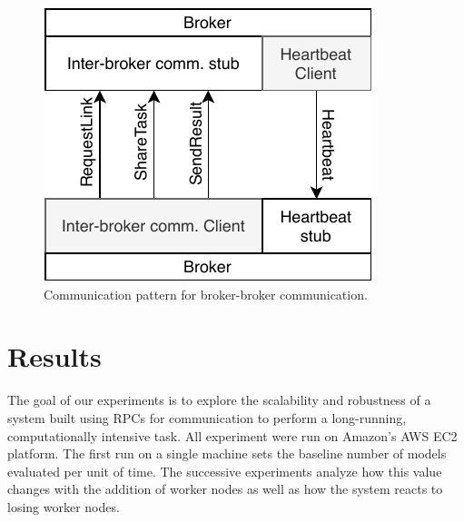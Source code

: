 \documentclass[conference]{IEEEtran}
\begin{document}
% 
% 
\begin{figure}
  \centering
  \includegraphics{img/broker_broker}
  \caption{Communication pattern for broker-broker communication.}
  \label{fig:broker-broker}
\end{figure}

\section{Results}
The goal of our experiments is to explore the scalability and robustness
of a system built using RPCs for communication to perform a long-running,
computationally intensive task. All experiment were run on Amazon's
AWS EC2 platform. The first run on a single machine sets the baseline
number of models evaluated per unit of time. The successive experiments
analyze how this value changes with the addition of worker nodes as well
as how the system reacts to losing worker nodes.
\end{document}
